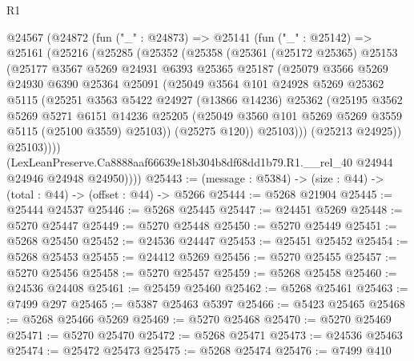 \begin{lexlean}{R1}
\begin{coremodule}
  @24567
    (@24872
      (fun ("_" : @24873) =>
      @25141
        (fun ("_" : @25142) =>
        @25161
          (@25216
            (@25285
              (@25352
                (@25358
                  (@25361
                    (@25172 @25365)
                    @25153
                    (@25177
                      @3567
                      @5269
                      @24931
                      @6393
                      @25365
                      @25187
                      (@25079
                        @3566
                        @5269
                        @24930
                        @6390
                        @25364
                        @25091
                        (@25049
                          @3564
                          @101
                          @24928
                          @5269
                          @25362
                          @5115
                          (@25251
                            @3563
                            @5422
                            @24927
                            (@13866 @14236)
                            @25362
                            (@25195
                              @3562
                              @5269
                              @5271
                              @6151
                              @14236
                              @25205
                              (@25049 @3560 @101 @5269 @5269 @3559 @5115 (@25100 @3559) @25103))
                            (@25275 @120))
                          @25103)))
                    (@25213 @24925))
                  @25103))))
          (LexLeanPreserve.Ca8888aaf66639e18b304b8df68dd1b79.R1.__rel_40
            @24944
            @24946
            @24948
            @24950))))
@25443 := (message : @5384) -> (size : @44) -> (total : @44) -> (offset : @44) -> @5266
@25444 := @5268 @21904
@25445 := @25444 @24537
@25446 := @5268 @25445
@25447 := @24451 @5269
@25448 := @5270 @25447
@25449 := @5270 @25448
@25450 := @5270 @25449
@25451 := @5268 @25450
@25452 := @24536 @24447
@25453 := @25451 @25452
@25454 := @5268 @25453
@25455 := @24412 @5269
@25456 := @5270 @25455
@25457 := @5270 @25456
@25458 := @5270 @25457
@25459 := @5268 @25458
@25460 := @24536 @24408
@25461 := @25459 @25460
@25462 := @5268 @25461
@25463 := @7499 @297
@25465 := @5387 @25463 @5397
@25466 := @5423 @25465
@25468 := @5268 @25466 @5269
@25469 := @5270 @25468
@25470 := @5270 @25469
@25471 := @5270 @25470
@25472 := @5268 @25471
@25473 := @24536 @25463
@25474 := @25472 @25473
@25475 := @5268 @25474
@25476 := @7499 @410

\end{coremodule}
\end{lexlean}
